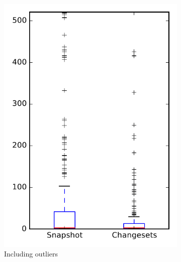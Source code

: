 
\begin{figure}
    \centering
    \begin{subfigure}{.4\textwidth}
        \centering
        \includegraphics[height=0.4\textheight]{figures/flt/rq1_zookeeper}
        \caption{Including outliers}\label{fig:flt:rq1:zookeeper_outlier}
    \end{subfigure}%
    \begin{subfigure}{.4\textwidth}
        \centering

\end{subfigure}
\end{figure}
